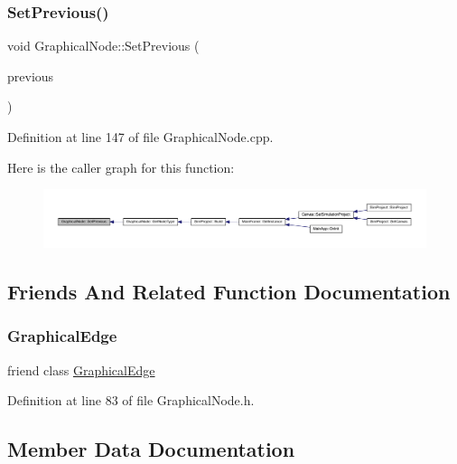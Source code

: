 \subsubsection{\texorpdfstring{Set\+Previous()}{SetPrevious()}}
{\footnotesize\ttfamily void Graphical\+Node\+::\+Set\+Previous (\begin{DoxyParamCaption}\item[{\hyperlink{class_graphical_node}{Graphical\+Node} $\ast$}]{previous }\end{DoxyParamCaption})}



Definition at line 147 of file Graphical\+Node.\+cpp.

Here is the caller graph for this function\+:
\nopagebreak
\begin{figure}[H]
\begin{center}
\leavevmode
\includegraphics[width=350pt]{class_graphical_node_ad165a0c444192d4c7ff6a07c62972dab_icgraph}
\end{center}
\end{figure}


\subsection{Friends And Related Function Documentation}
\mbox{\label{class_graphical_node_a2a860a1faf189243ba02f50ad8362bfa}} 
\subsubsection{\texorpdfstring{Graphical\+Edge}{GraphicalEdge}}
{\footnotesize\ttfamily friend class \hyperlink{class_graphical_edge}{Graphical\+Edge}\hspace{0.3cm}{\ttfamily [friend]}}



Definition at line 83 of file Graphical\+Node.\+h.



\subsection{Member Data Documentation}
\mbox{\label{class_graphical_node_a2bcf3e642619e571bd8b5eca3e7bdbb6}} 
